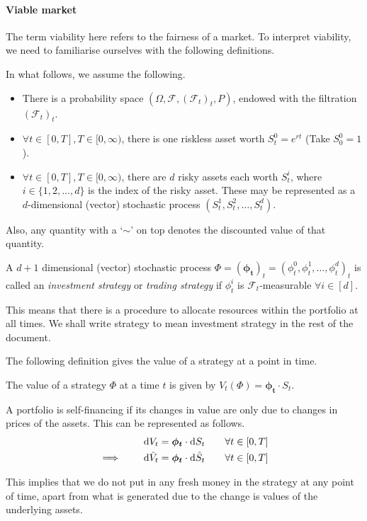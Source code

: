 \paragraph{Viable market}
The term viability here refers to the fairness of a market. To interpret viability, we need to familiarise ourselves with the following definitions.

In what follows, we assume the following.
\begin{itemize}
	\item There is a probability space $ (\Omega, \mathcal{F}, (\mathcal{F}_t)_t, P) $, endowed with the filtration $ (\mathcal{F}_t)_t $.
	\item $ \forall t \in [0, T], T \in [0, \infty) $, there is one riskless asset worth $ S_t^0 = e^{rt} $ (Take $ S_0^0 = 1 $).
	\item $ \forall t \in [0, T], T \in [0, \infty) $, there are $ d $ risky assets each worth $ S_t^i $, where $ i \in \{ 1, 2, \dots, d \} $ is the index of the risky asset. These may be represented as a $ d $-dimensional (vector) stochastic process $ ( S_t^1, S_t^2, \dots, S_t^d ) $.
\end{itemize}

Also, any quantity with a `$ \sim $' on top denotes the discounted value of that quantity.


\begin{dfn}
	A $ d + 1 $ dimensional (vector) stochastic process $ \Phi = (\bm{\phi_t})_t = (\phi_t^0, \phi_t^1, \dots, \phi_t^d)_t $ is called an \emph{investment strategy} or \emph{trading strategy} if $ \phi_t^i $ is $ \mathcal{F}_t $-measurable $ \forall i \in [d] $.
\end{dfn}
This means that there is a procedure to allocate resources within the portfolio at all times. We shall write strategy to mean investment strategy in the rest of the document.

The following definition gives the value of a strategy at a point in time.
\begin{dfn}
	The value of a strategy $ \Phi $ at a time $ t $ is given by $ V_t( \Phi ) = \bm{\phi_t} \cdot S_t $.
\end{dfn}

\begin{dfn}
	A portfolio is self-financing if its changes in value are only due to changes in prices of the assets. This can be represented as follows.
	\begin{subequations}
		\begin{align}
			\dif V_t &= \bm{\phi_t} \cdot \dif S_t \qquad \forall t \in [0, T]  \\
			\implies  \qquad  \dif \tilde{V}_t &= \bm{\phi_t} \cdot \dif \tilde{S}_t \qquad \forall t \in [0, T]
		\end{align}
	\end{subequations}
\end{dfn}
This implies that we do not put in any fresh money in the strategy at any point of time, apart from what is generated due to the change is values of the underlying assets.

